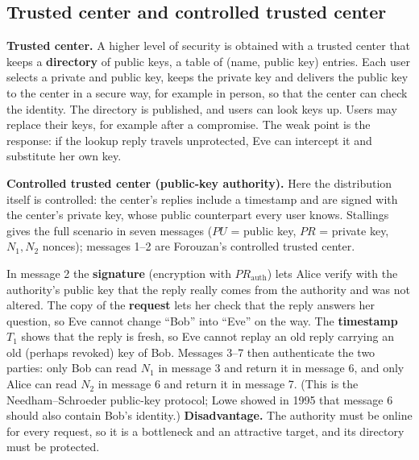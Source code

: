 \subsection{Trusted center and controlled trusted center \new}

\textbf{Trusted center.} A higher level of security is obtained with a trusted center that keeps a \textbf{directory} of public keys, a table of (name, public key) entries. Each user selects a private and public key, keeps the private key and delivers the public key to the center in a secure way, for example in person, so that the center can check the identity. The directory is published, and users can look keys up. Users may replace their keys, for example after a compromise. The weak point is the response: if the lookup reply travels unprotected, Eve can intercept it and substitute her own key.

\textbf{Controlled trusted center (public-key authority).} Here the distribution itself is controlled: the center's replies include a timestamp and are signed with the center's private key, whose public counterpart every user knows. Stallings gives the full scenario in seven messages ($PU$ = public key, $PR$ = private key, $N_1, N_2$ nonces); messages 1--2 are Forouzan's controlled trusted center.
\begin{center}
\end{center}
In message 2 the \textbf{signature} (encryption with $PR_{\text{auth}}$) lets Alice verify with the authority's public key that the reply really comes from the authority and was not altered. The copy of the \textbf{request} lets her check that the reply answers her question, so Eve cannot change ``Bob'' into ``Eve'' on the way. The \textbf{timestamp} $T_1$ shows that the reply is fresh, so Eve cannot replay an old reply carrying an old (perhaps revoked) key of Bob. Messages 3--7 then authenticate the two parties: only Bob can read $N_1$ in message 3 and return it in message 6, and only Alice can read $N_2$ in message 6 and return it in message 7. (This is the Needham--Schroeder public-key protocol; Lowe showed in 1995 that message 6 should also contain Bob's identity.) \textbf{Disadvantage.} The authority must be online for every request, so it is a bottleneck and an attractive target, and its directory must be protected.

